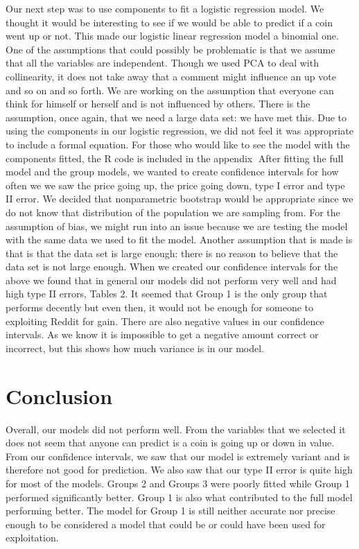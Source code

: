 \documentclass[12pt]{article}
\begin{document}
\indent Our next step was to use components to fit a logistic regression model. We thought it would be interesting to see if we would be able to predict if a coin went up or not. This made our logistic linear regression model a binomial one. One of the assumptions that could possibly be problematic is that we assume that all the variables are independent. Though we used PCA to deal with collinearity, it does not take away that a comment might influence an up vote and so on and so forth. We are working on the assumption that everyone can think for himself or herself and is not influenced by others. There is the assumption, once again, that we need a large data set: we have met this. Due to using the components in our logistic regression, we did not feel it was appropriate to include a formal equation. For those who would like to see the model with the components fitted, the R code is included in the appendix
\indent After fitting the full model and the group models, we wanted to create confidence intervals for how often we we saw the price going up, the price going down, type I error and type II error. We decided that nonparametric bootstrap would be appropriate since we do not know that distribution of the population we are sampling from. For the assumption of bias, we might run into an issue because we are testing the model with the same data we used to fit the model. Another assumption that is made is that is that the data set is large enough: there is no reason to believe that the data set is not large enough. When we created our confidence intervals for the above we found that in general our models did not perform very well and had high type II errors, Tables 2. It seemed that Group 1 is the only group that performs decently but even then, it would not be enough for someone to exploiting Reddit for gain. There are also negative values in our confidence intervals. As we know it is impossible to get a negative amount correct or incorrect, but this shows how much variance is in our model.

\section{Conclusion}
\indent\indent Overall, our models did not perform well. From the variables that we selected it does not seem that anyone can predict is a coin is going up or down in value. From our confidence intervals, we saw that our model is extremely variant and is therefore not good for prediction. We also saw that our type II error is quite high for most of the models. Groups 2 and Groups 3 were poorly fitted while Group 1 performed significantly better. Group 1 is also what contributed to the full model performing better. The model for Group 1 is still neither accurate nor precise enough to be considered a model that could be or could have been used for exploitation.
\end{document}
